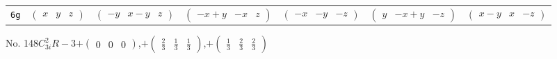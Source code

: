 \documentclass[fleqn,9pt,landscape]{jsarticle}
\begin{document}
\begin{center}
\begin{longtable}{ccccccc}
{\tt 6g} & $ \begin{pmatrix} x & y & z \end{pmatrix} $ & $ \begin{pmatrix} - y & x - y & z \end{pmatrix} $ & $ \begin{pmatrix} - x + y & - x & z \end{pmatrix} $ & $ \begin{pmatrix} - x & - y & - z \end{pmatrix} $ & $ \begin{pmatrix} y & - x + y & - z \end{pmatrix} $ & $ \begin{pmatrix} x - y & x & - z \end{pmatrix} $ \\
\end{longtable}
\end{center}
\newpage
No. 148\quad$C_{3i}^{2}$\quad$R-3$\quad[ trigonal ]\quad$+\begin{pmatrix} 0 & 0 & 0 \end{pmatrix}$,\quad $+\begin{pmatrix} \frac{2}{3} & \frac{1}{3} & \frac{1}{3} \end{pmatrix}$,\quad $+\begin{pmatrix} \frac{1}{3} & \frac{2}{3} & \frac{2}{3} \end{pmatrix}$
\end{document}
